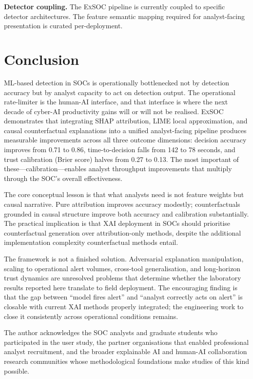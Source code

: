 \documentclass[sigconf,nonacm]{acmart}
\begin{document}
\textbf{Detector coupling.} The \textsc{ExSOC} pipeline is currently
coupled to specific detector architectures. The feature semantic mapping
required for analyst-facing presentation is curated per-deployment.

\section{Conclusion}

ML-based detection in SOCs is operationally bottlenecked not by detection
accuracy but by analyst capacity to act on detection output. The
operational rate-limiter is the human-AI interface, and that interface is
where the next decade of cyber-AI productivity gains will or will not be
realised. \textsc{ExSOC} demonstrates that integrating SHAP attribution,
LIME local approximation, and causal counterfactual explanations into a
unified analyst-facing pipeline produces measurable improvements across
all three outcome dimensions: decision accuracy improves from 0.71 to
0.86, time-to-decision falls from 142 to 78 seconds, and trust
calibration (Brier score) halves from 0.27 to 0.13. The most important of
these---calibration---enables analyst throughput improvements that
multiply through the SOC's overall effectiveness.

The core conceptual lesson is that what analysts need is not feature
weights but causal narrative. Pure attribution improves accuracy
modestly; counterfactuals grounded in causal structure improve both
accuracy and calibration substantially. The practical implication is that
XAI deployment in SOCs should prioritise counterfactual generation over
attribution-only methods, despite the additional implementation complexity
counterfactual methods entail.

The framework is not a finished solution. Adversarial explanation
manipulation, scaling to operational alert volumes, cross-tool
generalisation, and long-horizon trust dynamics are unresolved problems
that determine whether the laboratory results reported here translate to
field deployment. The encouraging finding is that the gap between
``model fires alert'' and ``analyst correctly acts on alert'' is closable
with current XAI methods properly integrated; the engineering work to
close it consistently across operational conditions remains.

\begin{acks}
The author acknowledges the SOC analysts and graduate students who
participated in the user study, the partner organisations that enabled
professional analyst recruitment, and the broader explainable AI and
human-AI collaboration research communities whose methodological
foundations make studies of this kind possible.
\end{acks}
\end{document}
